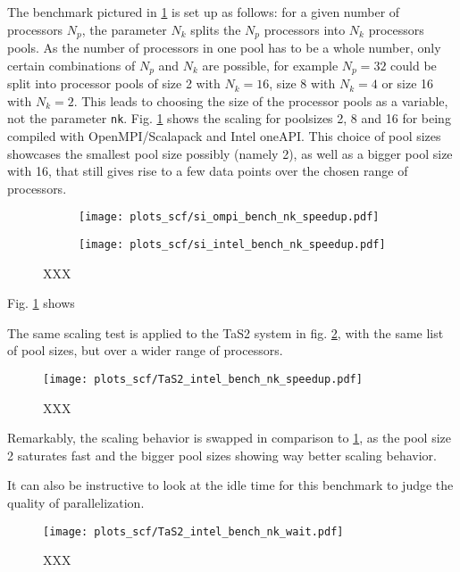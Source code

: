 \documentclass[main.tex]{subfiles}
\begin{document}
The benchmark pictured in \ref{fig:scaling_nk_si} is set up as follows: for a given number of processors \(N_p\), the parameter \(N_k\) splits the \(N_p\) processors into \(N_k\) processors pools.
As the number of processors in one pool has to be a whole number, only certain combinations of \(N_p\) and \(N_k\) are possible, for example \(N_p = 32\) could be split into processor pools of size 2 with \(N_k = 16\), size 8 with \(N_k = 4\) or size 16 with \(N_k = 2\).
This leads to choosing the size of the processor pools as a variable, not the parameter \texttt{nk}.
Fig. \ref{fig:scaling_nk_si} shows the scaling for poolsizes 2, 8 and 16 for \QE being compiled with OpenMPI/Scalapack and Intel oneAPI.
This choice of pool sizes showcases the smallest pool size possibly (namely 2), as well as a bigger pool size with 16, that still gives rise to a few data points over the chosen range of processors.

\begin{figure}[h!]
\begin{subfigure}[b]{0.4\textwidth}
    \centering
    \texttt{[image: plots\_scf/si\_ompi\_bench\_nk\_speedup.pdf]}
\end{subfigure}
\begin{subfigure}[b]{0.4\textwidth}
    \centering
    \texttt{[image: plots\_scf/si\_intel\_bench\_nk\_speedup.pdf]}
\end{subfigure}
\caption{XXX}
\label{fig:scaling_nk_si}
\end{figure}

Fig. \ref{fig:scaling_nk_si} shows 

The same scaling test is applied to the TaS2 system in fig. \ref{fig:scaling_nk_tas2}, with the same list of pool sizes, but over a wider range of processors.

\begin{figure}[h!]
    \centering
    \texttt{[image: plots\_scf/TaS2\_intel\_bench\_nk\_speedup.pdf]}
    \caption{XXX}
    \label{fig:scaling_nk_tas2}
\end{figure}

Remarkably, the scaling behavior is swapped in comparison to \ref{fig:scaling_nk_si}, as the pool size 2 saturates fast and the bigger pool sizes showing way better scaling behavior.


It can also be instructive to look at the idle time for this benchmark to judge the quality of parallelization. 

\begin{figure}[h!]
    \centering
    \texttt{[image: plots\_scf/TaS2\_intel\_bench\_nk\_wait.pdf]}
    \caption{XXX}
    \label{fig:scaling_nk_tas2_wait}
\end{figure}
\end{document}
